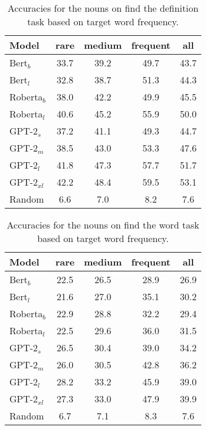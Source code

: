 \documentclass[11pt,a4paper]{article}
\begin{document}
\begin{table}
    \centering
    \begin{tabular}{l|cccc}
    \hline
         \textbf{Model} & \textbf{rare} & \textbf{medium} & \textbf{frequent} & \textbf{all} \\ \hline
     Bert$_{b}$ & 33.7 & 39.2 & 49.7 & 43.7 \\
     Bert$_{l}$ & 32.8 & 38.7 & 51.3 & 44.3 \\
     Roberta$_{b}$ & 38.0 & 42.2 & 49.9 & 45.5 \\
     Roberta$_{l}$ & 40.6 & 45.2 & 55.9 & 50.0 \\ \hline
     GPT-2$_{s}$ & 37.2 & 41.1 & 49.3 & 44.7 \\
     GPT-2$_{m}$ & 38.5 & 43.0 & 53.3 & 47.6 \\
     GPT-2$_{l}$ & 41.8 & 47.3 & 57.7 & 51.7 \\
     GPT-2$_{xl}$ & 42.2 & 48.4 & 59.5 & 53.1 \\ \hline
     Random & 6.6 & 7.0 & 8.2 & 7.6 \\ \hline 
     
    \end{tabular}
    \caption{Accuracies for the nouns on find the definition task based on target word frequency.}
    \label{tab:freq_results_find_the_definition}
\end{table}


\begin{table}
    \centering
    \begin{tabular}{l|cccc}
    \hline
        \textbf{Model} & \textbf{rare} & \textbf{medium} & \textbf{frequent} & \textbf{all}\\ \hline
     Bert$_{b}$ & 22.5 & 26.5 & 28.9 & 26.9 \\
     Bert$_{l}$ & 21.6 & 27.0 & 35.1 & 30.2 \\
     Roberta$_{b}$ & 22.9 & 28.8 & 32.2 & 29.4 \\
     Roberta$_{l}$ & 22.5 & 29.6 & 36.0 & 31.5 \\ \hline
     GPT-2$_{s}$ & 26.5 & 30.4 & 39.0 & 34.2 \\
     GPT-2$_{m}$ & 26.0 & 30.5 & 42.8 & 36.2 \\
     GPT-2$_{l}$ & 28.2 & 33.2 & 45.9 & 39.0 \\
     GPT-2$_{xl}$ & 27.3 & 33.0 & 47.9 & 39.9 \\ \hline
     Random & 6.7 & 7.1 & 8.3 & 7.6 \\ \hline 
     
    \end{tabular}
    \caption{Accuracies for the nouns on find the word task based on target word frequency.}
    \label{tab:freq_results_find_the_word}
\end{table}
\end{document}
